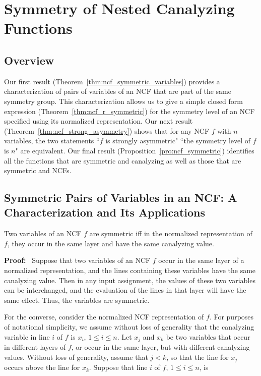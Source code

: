 \section{Symmetry of Nested Canalyzing Functions}
\label{sec:ncf_and_symmetry}

\subsection{Overview}
\label{sse:res_overview}
Our first result (Theorem~\ref{thm:ncf_symmetric_variables})
provides a characterization of pairs of variables of an NCF
that are part of the same symmetry group. 
This characterization allows us to give a simple closed form
expression (Theorem~\ref{thm:ncf_r_symmetric}) 
for the symmetry level of an NCF specified using
its normalized representation.
Our next result (Theorem~\ref{thm:ncf_strong_asymmetry})
shows that for any NCF $f$ with $n$ variables,
the two statements ``$f$ is strongly asymmetric"
``the symmetry level of $f$ is $n$" are equivalent. 
Our final result (Proposition~\ref{pro:ncf_symmetric})
identifies all the functions that are symmetric and
canalyzing as well as those that are symmetric and NCFs.

\subsection{Symmetric Pairs of Variables in an NCF: A Characterization
and Its Applications}
\label{sse:ncf_strong_sym}

\begin{theorem}\label{thm:ncf_symmetric_variables}
Two variables of an NCF $f$ are symmetric iff
in the normalized representation of $f$,
they occur in the same layer and have the same canalyzing value.
\end{theorem}
\noindent
\textbf{Proof:}~
Suppose that two variables of an NCF $f$ occur in the same layer of a
normalized representation, and the lines containing these variables
have the same canalyzing value.  Then in any input assignment, the
values of these two variables can be interchanged, and the evaluation
of the lines in that layer will have the same effect.  Thus, the
variables are symmetric.

For the converse, consider the normalized NCF representation of $f$. 
For purposes of notational simplicity, we assume without loss of generality that the
canalyzing variable in line $i$ of $f$ is $x_i$, $1 \leq i \leq n$.
Let  $x_j$ and $x_k$ be two variables that occur in different
layers of $f$, or occur in the same layer, but with different
canalyzing values.  Without loss of generality, 
assume that $j < k$, so that the line for
$x_j$ occurs above the line for $x_k$.
Suppose that line $i$ of $f$, $1 \leq i \leq n$, is 


